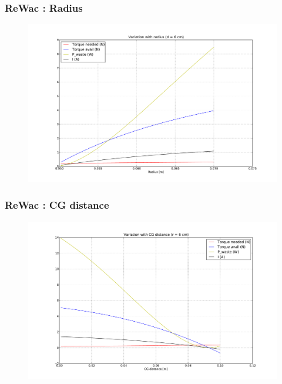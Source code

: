 \begin{frame}
\frametitle{ReWac : Radius}
\begin{figure}
\centering
\includegraphics[width=\textwidth]{fig/rewac_radius.pdf}
\end{figure}
\end{frame}

\begin{frame}
\frametitle{ReWac : CG distance}
\begin{figure}
\centering
\includegraphics[width=\textwidth]{fig/rewac_dist.pdf}
\end{figure}
\end{frame}

